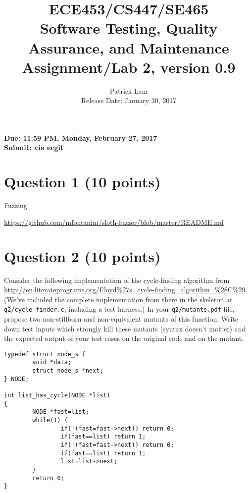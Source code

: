 \documentclass[10pt,hidelinks]{article}
\begin{document}
\title{
ECE453/CS447/SE465 \\
Software Testing, Quality Assurance, and Maintenance\\
Assignment/Lab 2, version 0.9}
\author{Patrick Lam \\
{Release Date:  January 30, 2017} \\
}
\renewcommand{\today}{}
\maketitle

\begin{center}

{\bf Due:  11:59 PM, Monday, February 27, 2017} \\
{\bf Submit: via ecgit }\\
\end{center}

\section*{Question 1 (10 points)}

Fuzzing

\url{https://github.com/mfontanini/sloth-fuzzer/blob/master/README.md}

\section*{Question 2 (10 points)} 

Consider the following implementation of the cycle-finding algorithm from \url{http://en.literateprograms.org/Floyd%27s_cycle-finding_algorithm_%28C%29}. (We've included the complete implementation from there in the skeleton at {\tt q2/cycle-finder.c}, including a test harness.) In your {\tt q2/mutants.pdf} file, propose two non-stillborn and non-equivalent mutants of this function. Write down test inputs which strongly kill these mutants (syntax doesn't matter) and the expected output of your test cases on the original code and on the mutant.

\begin{lstlisting}
typedef struct node_s {
        void *data;
        struct node_s *next;
} NODE;

int list_has_cycle(NODE *list)
{
        NODE *fast=list;
        while(1) {
                if(!(fast=fast->next)) return 0;
                if(fast==list) return 1;
                if(!(fast=fast->next)) return 0;
                if(fast==list) return 1;
                list=list->next;
        }
        return 0;
}
\end{lstlisting}
\end{document}
